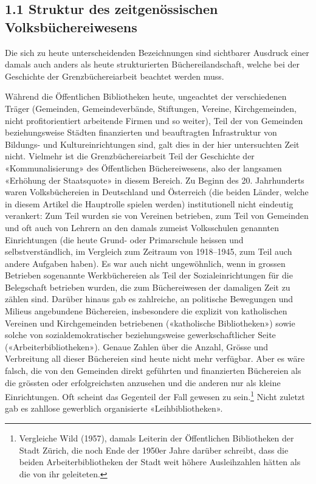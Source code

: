 \documentclass[a4paper,
fontsize=11pt,
oneside,
numbers=noperiodatend,
parskip=half-,
bibliography=totoc,
final
]{scrartcl}
\begin{document}
\hypertarget{struktur-des-zeitgenuxf6ssischen-volksbuxfcchereiwesens}{%
\subsection{1.1 Struktur des zeitgenössischen
Volksbüchereiwesens}\label{struktur-des-zeitgenuxf6ssischen-volksbuxfcchereiwesens}}

Die sich zu heute unterscheidenden Bezeichnungen sind sichtbarer
Ausdruck einer damals auch anders als heute strukturierten
Büchereilandschaft, welche bei der Geschichte der Grenzbüchereiarbeit
beachtet werden muss.

Während die Öffentlichen Bibliotheken heute, ungeachtet der
verschiedenen Träger (Gemeinden, Gemeindeverbände, Stiftungen, Vereine,
Kirchgemeinden, nicht profitorientiert arbeitende Firmen und so weiter),
Teil der von Gemeinden beziehungsweise Städten finanzierten und
beauftragten Infrastruktur von Bildungs- und Kultureinrichtungen sind,
galt dies in der hier untersuchten Zeit nicht. Vielmehr ist die
Grenzbüchereiarbeit Teil der Geschichte der «Kommunalisierung» des
Öffentlichen Büchereiwesens, also der langsamen «Erhöhung der
Staatsquote» in diesem Bereich. Zu Beginn des 20. Jahrhunderts waren
Volksbüchereien in Deutschland und Österreich (die beiden Länder, welche
in diesem Artikel die Hauptrolle spielen werden) institutionell nicht
eindeutig verankert: Zum Teil wurden sie von Vereinen betrieben, zum
Teil von Gemeinden und oft auch von Lehrern an den damals zumeist
Volksschulen genannten Einrichtungen (die heute Grund- oder Primarschule
heissen und selbstverständlich, im Vergleich zum Zeitraum von
1918--1945, zum Teil auch andere Aufgaben haben). Es war auch nicht
ungewöhnlich, wenn in grossen Betrieben sogenannte Werkbüchereien als
Teil der Sozialeinrichtungen für die Belegschaft betrieben wurden, die
zum Büchereiwesen der damaligen Zeit zu zählen sind. Darüber hinaus gab
es zahlreiche, an politische Bewegungen und Milieus angebundene
Büchereien, insbesondere die explizit von katholischen Vereinen und
Kirchgemeinden betriebenen («katholische Bibliotheken») sowie solche von
sozialdemokratischer beziehungsweise gewerkschaftlicher Seite
(«Arbeiterbibliotheken»). Genaue Zahlen über die Anzahl, Grösse und
Verbreitung all dieser Büchereien sind heute nicht mehr verfügbar. Aber
es wäre falsch, die von den Gemeinden direkt geführten und finanzierten
Büchereien als die grössten oder erfolgreichsten anzusehen und die
anderen nur als kleine Einrichtungen. Oft scheint das Gegenteil der Fall
gewesen zu sein.\footnote{Vergleiche Wild (1957), damals Leiterin der
  Öffentlichen Bibliotheken der Stadt Zürich, die noch Ende der 1950er
  Jahre darüber schreibt, dass die beiden Arbeiterbibliotheken der Stadt
  weit höhere Ausleihzahlen hätten als die von ihr geleiteten.} Nicht
zuletzt gab es zahllose gewerblich organisierte «Leihbibliotheken».
\end{document}
